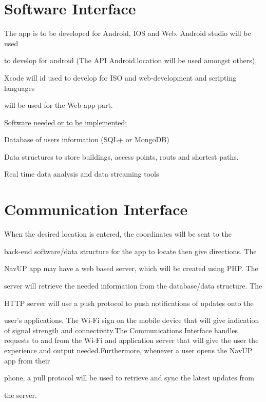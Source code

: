 \documentclass[11pt]{article}
\begin{document}
\section{Software Interface}

{\raggedright

The app is to be developed for Android, IOS and Web. Android studio will be used

to develop for android (The API Android.location will be used amongst others),

Xcode will id used to develop for ISO and web-development and scripting languages

will be used for the Web app part.

}



{\raggedright



\uline{Software needed or to be implemented:}

}



{\raggedright

Database of users information (SQL+ or MongoDB)

}



{\raggedright

Data structures to store buildings, access points, routs and shortest paths.

}



{\raggedright

Real time data analysis and data streaming tools

}



\section{Communication Interface}

{\raggedright

When the desired location is entered, the coordinates will be sent to the

back-end software/data structure for the app to locate then give directions. The

NavUP app may have a web based server, which will be created using PHP. The

server will retrieve the needed information from the database/data structure. The

HTTP server will use a push protocol to push notifications of updates onto the

user's applications. The Wi-Fi sign on the mobile device that will give indication of signal strength and connectivity.The Communications Interface handles requests to and from the Wi-Fi and application server that will give the user the experience and output needed.Furthermore, whenever a user opens the NavUP app from their

phone, a pull protocol will be used to retrieve and sync the latest updates from

the server.

}
\end{document}
